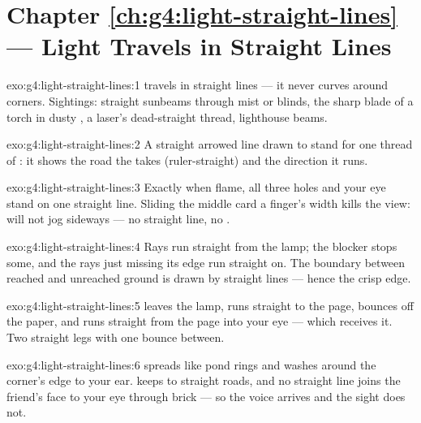 \section*{Chapter \ref{ch:g4:light-straight-lines} --- Light Travels in Straight Lines}

\begin{solution}{exo:g4:light-straight-lines:1}
 travels in straight lines --- it never curves around
corners. Sightings: straight sunbeams through mist or blinds, the
sharp blade of a torch in dusty , a laser's dead-straight
thread, lighthouse beams.
\end{solution}

\begin{solution}{exo:g4:light-straight-lines:2}
A straight arrowed line drawn to stand for one thread of : it
shows the road the  takes (ruler-straight) and the direction
it runs.
\end{solution}

\begin{solution}{exo:g4:light-straight-lines:3}
Exactly when flame, all three holes and your eye stand on one
straight line. Sliding the middle card a finger's width kills the
view:  will not jog sideways --- no straight line, no .
\end{solution}

\begin{solution}{exo:g4:light-straight-lines:4}
Rays run straight from the lamp; the blocker stops some, and the
rays just missing its edge run straight on. The boundary between
reached and unreached ground is drawn by straight lines --- hence
the crisp edge.
\end{solution}

\begin{solution}{exo:g4:light-straight-lines:5}
 leaves the lamp, runs straight to the page, bounces off the
paper, and runs straight from the page into your eye --- which
receives it. Two straight legs with one bounce between.
\end{solution}

\begin{solution}{exo:g4:light-straight-lines:6}
 spreads like pond rings and washes around the corner's edge
to your ear.  keeps to straight roads, and no straight line
joins the friend's face to your eye through brick --- so the voice
arrives and the sight does not.
\end{solution}


